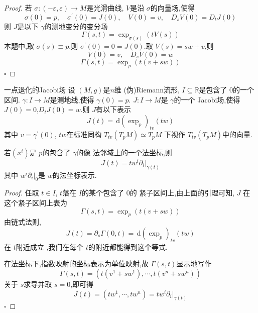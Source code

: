 \documentclass[../../几何与拓扑.tex]{subfiles}
\begin{document}
\begin{proof}
    若 \(   \sigma :\left( - \varepsilon , \varepsilon  \right)\to M   \)是光滑曲线, \(  V  \)是沿 \(   \sigma   \)的向量场,使得 \[
     \sigma \left( 0 \right)= p,\quad  \sigma ^{\prime} \left( 0 \right)= J\left( 0 \right), \quad V\left( 0 \right)= v,\quad D_{s}V\left( 0 \right)= D_{t}J\left( 0 \right)      
    \]     则 \(  J  \)是以下 \(   \gamma   \)的测地变分的变分场 \[
     \Gamma \left( s,t \right)= \exp _{ \sigma \left( s \right) }\left( tV\left( s \right)  \right)  
    \]  本题中,取 \(   \sigma \left( s \right)\equiv p   \),则 \(   \sigma ^{\prime} \left( 0 \right)= 0= J\left( 0 \right)    \).取 \(  V\left( s \right)= s w + v  \),则 \[
    V\left( 0 \right)= v,\quad  D_{s}V\left( 0 \right)=  w
    \]   \[
     \Gamma \left( s,t \right)= \exp _{p}\left( t\left( v+ sw \right)  \right)  
    \]
    \hfill $\square$
\end{proof}

\begin{proposition}{一点退化的Jacobi场}
    设 \(  \left( M,g \right)   \)是\(  n  \)维 (伪)Riemann流形, \(  I\subseteq \mathbb{R}   \)是包含了 \(  0  \)的一个区间. \(   \gamma :I\to M  \)是测地线,使得 \(   \gamma \left( 0 \right)= p   \). \(  J:I\to M  \)是 \(   \gamma   \)的一个 Jacobi场,使得 \(  J\left( 0 \right)= 0   \),\(  D_{t}J\left( 0 \right)= w   \).则 \(  J  \)有以下表示 \begin{equation}
      \label{一点消失的Jacobi场}
    J\left( t \right)= \,\mathrm{d} \left( \exp _{p} \right)_{tv}\left( tw \right)   
    \end{equation}其中 \(  v =   \gamma ^{\prime} \left( 0 \right)   \),  \(  tw  \)在标准同构 \(  T_{tv}\left( T_{p}M \right) \simeq T_{p}M  \)             下视作 \(  T_{tv}\left( T_{p}M \right)   \)中的向量.
    
    若\(  \left( x^{i} \right)   \)是 \(  p  \)的包含了 \(   \gamma   \)的像 法邻域上的一个法坐标,则 \[
    J\left( t \right)= tw^{i}\left.  \partial _{i} \right|_{ \gamma \left( t \right) } 
    \]  其中 \(  w^{i} \left.  \partial _{i} \right|_{0}  \)是 \(  w  \)的法坐标表示.  
\end{proposition}

\begin{proof}
    任取 \(  t \in I  \), \(  t  \)落在 \(  I  \)的某个包含了 \(  0  \)的 紧子区间上,由上面的引理可知, \(  J  \)    在这个紧子区间上表为 \[
     \Gamma \left( s,t \right)=  \exp _{p}\left( t\left( v+ sw \right)  \right) 
    \]由链式法则, \[
    J\left( t \right)=  \partial _{s} \Gamma \left( 0,t \right)= \,\mathrm{d} \left( \exp _{p} \right)_{tv}\left( tw \right)    
    \]在 \(  t  \)附近成立 ,我们在每个 \(  t  \)的附近都能得到这个等式.
    
在法坐标下,指数映射的坐标表示为单位映射,故 \(   \Gamma \left( s,t \right)   \)显示地写作 \[
     \Gamma \left( s,t \right)= \left( t\left( v^{1}+ sw^{1} \right),\cdots ,t\left( v^{n}+ sw^{n} \right)   \right)  
    \] 关于 \(  s  \)求导并取 \(  s= 0  \),即可得 \[
    J\left( t \right)= \left( tw^{1},\cdots ,tw^{n} \right)= t w^{i} \left.  \partial _{i} \right|_{ \gamma \left( t \right) }  
    \]  
    \hfill $\square$
\end{proof}
\end{document}
